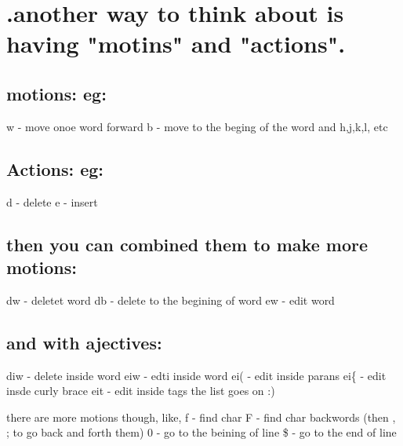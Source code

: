 \documentclass[11pt]{article}
\author{bmax}
\date{\today}
\title{}
\begin{document}
\tableofcontents

\section{.another way to think about is having "motins" and "actions".}
\label{sec:org79e9a86}
\subsection{motions: eg:}
\label{sec:org30e618e}
w - move onoe word forward
b - move to the beging of the word
and h,j,k,l, etc

\subsection{Actions: eg:}
\label{sec:orgc3601cd}
d - delete
e - insert

\subsection{then you can combined them to make more motions:}
\label{sec:org72a9387}
dw - deletet word
db - delete to the begining of word
ew - edit word

\subsection{and with ajectives:}
\label{sec:org955a912}
diw - delete inside word
eiw - edti inside word
ei( - edit inside parans
ei\{ - edit insde curly brace
eit - edit inside tags
the list goes on :)

there are more motions though, like,
f - find char
F - find char backwords
(then , ; to go back and forth them)
0 - go to the beining of line
\$ - go to the end of line
\end{document}
